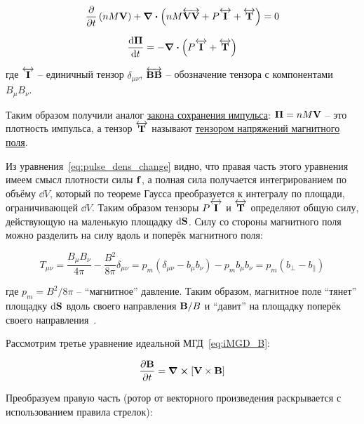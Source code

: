 \documentclass[10pt, a4paper]{article}
\begin{document}
\begin{equation*}
	\pdv{}{t}\left( nM\vb{V} \right) + \div{\left( nM\overleftrightarrow{\vb{VV}} + P\overleftrightarrow{\vb{I}} + \overleftrightarrow{\vb{T}} \right)} = 0
\end{equation*}

\begin{equation}
	\label{eq:pulse_dens_change}
	\dv{\vb{\Pi}}{t} = - \div{\left( P\overleftrightarrow{\vb{I}} + \overleftrightarrow{\vb{T}} \right)}
\end{equation}

где $\overleftrightarrow{\vb{I}}$ -- единичный тензор $\delta_{\mu\nu}$, $\overleftrightarrow{\vb{BB}}$ -- обозначение тензора с компонентами $B_\mu B_\nu$.

Таким образом получили аналог \uline{закона сохранения импульса}: $\vb{\Pi}=nM\vb{V}$ -- это плотность импульса, а тензор $\overleftrightarrow{\vb{T}}$ называют \uline{тензором напряжений магнитного поля}. 	

Из уравнения~\eqref{eq:pulse_dens_change} видно, что правая часть этого уравнения имеем смысл плотности силы $\vb{f}$, а полная сила получается интегрированием по объёму $\dd V$, который по теореме Гаусса преобразуется к интегралу по площади, ограничивающей $\dd V$. Таким образом тензоры $P\overleftrightarrow{\vb{I}}$ и $\overleftrightarrow{\vb{T}}$ определяют общую силу, действующую на маленькую площадку $\dd\vb{S}$.
Силу со стороны магнитного поля можно разделить на силу вдоль и поперёк магнитного поля:

\begin{equation*}
	T_{\mu\nu} = \frac{B_\mu B_\nu}{4\pi}-\frac{B^2}{8\pi}\delta_{\mu\nu} = p_m \left( \delta_{\mu\nu} - b_\mu b_\nu \right) - p_m b_\mu b_\nu = p_m (b_\perp - b_\parallel)
\end{equation*}

где $p_m = B^2 / 8 \pi$ -- ``магнитное'' давление. Таким образом, магнитное поле ``тянет'' площадку $\dd \vb{S}$ вдоль своего направления $\vb{B}/B$ и ``давит'' на площадку поперёк своего направления~\cite{kotelnikov}.

Рассмотрим третье уравнение идеальной МГД~\eqref{eq:iMGD_B}:

\begin{equation*}
	\pdv{\vb{B}}{t} = \curl{[\vb{V}\times\vb{B}]}
\end{equation*}

Преобразуем правую часть (ротор от векторного произведения раскрывается с использованием правила стрелок):
\end{document}
